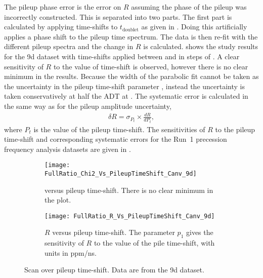 The pileup phase error is the error on $R$ assuming the phase of the pileup was incorrectly constructed. This is separated into two parts. The first part is calculated by applying time-shifts to $t_{\text{doublet}}$ as given in . Doing this artificially applies a phase shift to the pileup time spectrum. The data is then re-fit with the different pileup spectra and the change in $R$ is calculated.  shows the study results for the 9d dataset with time-shifts applied between  and  in steps of . A clear sensitivity of $R$ to the value of time-shift is observed, however there is no clear minimum in the \chisq results. Because the width of the \chisq parabolic fit cannot be taken as the uncertainty in the pileup time-shift parameter , instead the uncertainty is taken conservatively at half the ADT at . The systematic error is calculated in the same way as for the pileup amplitude uncertainty,
    \begin{align}
        \delta R = \sigma_{P_{t}} \times \frac{dR}{dP_{t}},
    \end{align}
where $P_{t}$ is the value of the pileup time-shift. The sensitivities of $R$ to the pileup time-shift and corresponding systematic errors for the Run~1 precession frequency analysis datasets are given in .


\begin{figure}
\centering
    \begin{subfigure}[t]{0.45\textwidth}
        \centering
        \texttt{[image: FullRatio\_Chi2\_Vs\_PileupTimeShift\_Canv\_9d]}
        \caption{\chisq versus pileup time-shift. There is no clear minimum in the plot.} 
    \end{subfigure}%
    \hspace{1cm}
    \begin{subfigure}[t]{0.45\textwidth}
        \centering
        \texttt{[image: FullRatio\_R\_Vs\_PileupTimeShift\_Canv\_9d]}
        \caption{$R$ versus pileup time-shift. The parameter $p_{1}$ gives the sensitivity of $R$ to the value of the pile time-shift, with units in ppm/ns.}
    \end{subfigure}
\caption[Pileup time-shift scan]{Scan over pileup time-shift. Data are from the 9d dataset.}
\label{fig:PTSscan}
\end{figure}


